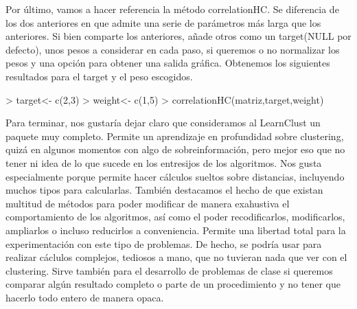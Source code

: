\documentclass[a4paper]{article}
\begin{document}
Por último, vamos a hacer referencia la método correlationHC. Se diferencia de los dos anteriores en que admite una serie de parámetros más larga que los anteriores. Si bien comparte los anteriores, añade otros como un target(NULL por defecto), unos pesos a considerar en cada paso, si queremos o no normalizar los pesos y una opción para obtener una salida gráfica.
Obtenemos los siguientes resultados para el target y el peso escogidos.
\begin{Schunk}
\begin{Sinput}
> target<- c(2,3)
> weight<- c(1,5)
> correlationHC(matriz,target,weight)
\end{Sinput}
\end{Schunk}

Para terminar, nos gustaría dejar claro que consideramos al LearnClust un paquete muy completo. Permite un aprendizaje en profundidad sobre clustering, quizá en algunos momentos con algo de sobreinformación, pero mejor eso que no tener ni idea de lo que sucede en los entresijos de los algoritmos.
Nos gusta especialmente porque permite hacer cálculos sueltos sobre distancias, incluyendo muchos tipos para calcularlas. También destacamos el hecho de que existan multitud de métodos para poder modificar de manera exahustiva el comportamiento de los algoritmos, así como el poder recodificarlos, modificarlos, ampliarlos o incluso reducirlos a conveniencia. 
Permite una libertad total para la experimentación con este tipo de problemas. De hecho, se podría usar para realizar cáclulos complejos, tediosos a mano, que no tuvieran nada que ver con el clustering. Sirve también para el desarrollo de problemas de clase si queremos comparar algún resultado completo o parte de un procedimiento y no tener que hacerlo todo entero de manera opaca.
\end{document}
